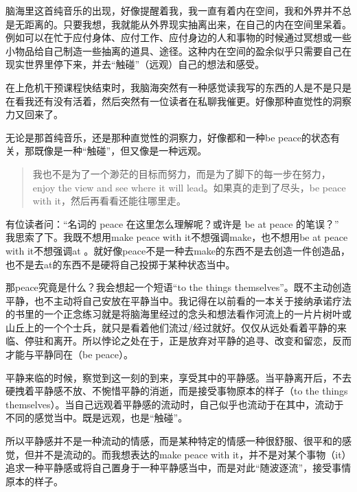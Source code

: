 脑海里这首纯音乐的出现，好像提醒着我，我一直有着内在空间，我和外界并不总是无距离的。只要我想，我就能从外界现实抽离出来，在自己的内在空间里呆着。例如可以在忙于应付身体、应付工作、应付身边的人和事物的时候通过冥想或一些小物品给自己制造一些抽离的道具、途径。这种内在空间的盈余似乎只需要自己在现实世界里停下来，并去“触碰”（远观）自己的想法和感受。

在上危机干预课程快结束时，我脑海突然有一种感觉\pozhehao{}读我写的东西的人是不是只是在看我还有没有活着，然后突然有一位读者在私聊我催更。好像那种直觉性的洞察力又回来了。

无论是那首纯音乐，还是那种直觉性的洞察力，好像都和一种be peace的状态有关，那既像是一种“触碰”，但又像是一种远观。

\blockquote{
    我也不是为了一个渺茫的目标而努力，而是为了脚下的每一步在努力，enjoy the view and see where it will lead。如果真的走到了尽头，be peace with it，然后再看看还能往哪里走。

}

有位读者问：“名词的 peace 在这里怎么理解呢？或许是 be at peace 的笔误？” 我思索了下。我既不想用make peace with it\pozhehao{}不想强调make，也不想用be at peace with it\pozhehao{}不想强调at 。就好像peace不是一种去make的东西\pozhehao{}不是去创造一件创造品，也不是去at的东西\pozhehao{}不是硬将自己投掷于某种状态当中。

那peace究竟是什么？我会想起一个短语“to the things themselves”。既不主动创造平静，也不主动将自己安放在平静当中。我记得在以前看的一本关于接纳承诺疗法的书里的一个正念练习就是将脑海里经过的念头和想法看作河流上的一片片树叶或山丘上的一个个士兵，就只是看着他们流过/经过就好。仅仅从远处看着平静的来临、停驻和离开。所以悖论之处在于，正是放弃对平静的追寻、改变和留恋，反而才能与平静同在（be peace）。

平静来临的时候，察觉到这一刻的到来，享受其中的平静感。当平静离开后，不去硬拽着平静感不放、不惋惜平静的消逝，而是接受事物原本的样子（to the things themselves）。当自己远观着平静感的流动时，自己似乎也流动于在其中，流动于不同的感觉当中。既是远观，也是“触碰”。

所以平静感并不是一种流动的情感，而是某种特定的情感\pozhehao{}一种很舒服、很平和的感觉，但并不是流动的。而我想表达的make peace with it，并不是对某个事物（it）追求一种平静感或将自己置身于一种平静感当中，而是对此“随波逐流”，接受事情原本的样子。


